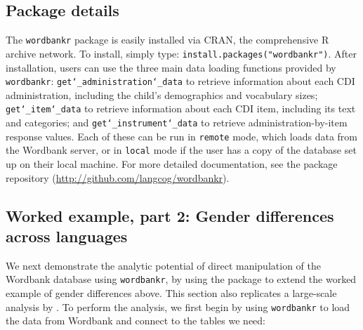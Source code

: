 \documentclass[man,noapacite]{apa}
\begin{document}
\subsection{Package details}

The \texttt{wordbankr} package is easily installed via CRAN, the comprehensive R archive network. To install, simply type: \texttt{install.packages("wordbankr")}. After installation, users can use the three main data loading functions provided by \texttt{wordbankr}: \texttt{get\char`_administration\char`_data} to retrieve information about each CDI administration, including the child's demographics and vocabulary sizes; \texttt{get\char`_item\char`_data} to retrieve information about each CDI item, including its text and categories; and \texttt{get\char`_instrument\char`_data} to retrieve administration-by-item response values. Each of these can be run in \texttt{remote} mode, which loads data from the Wordbank server, or in \texttt{local} mode if the user has a copy of the database set up on their local machine. For more detailed documentation, see the package repository (\url{http://github.com/langcog/wordbankr}).

\subsection{Worked example, part 2: Gender differences across languages}

We next demonstrate the analytic potential of direct manipulation of the Wordbank database using \texttt{wordbankr}, by using the package to extend the worked example of gender differences above. This section also replicates a large-scale analysis by . To perform the analysis, we first begin by using \texttt{wordbankr} to load the data from Wordbank and connect to the tables we need:
\end{document}
